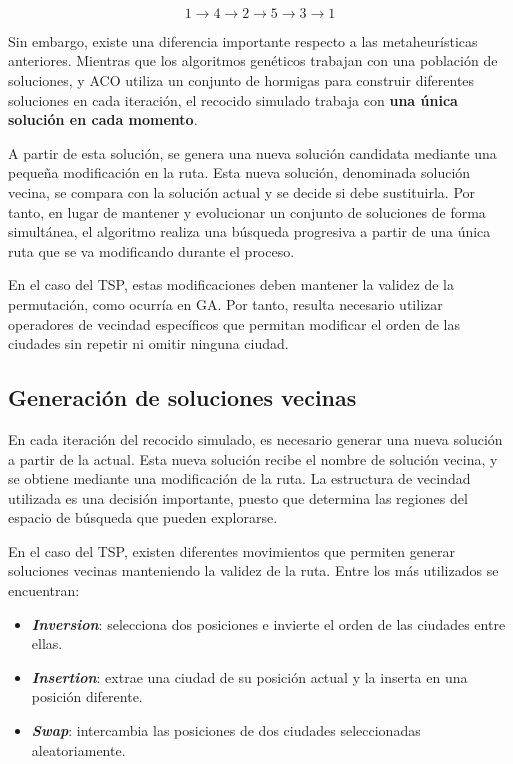 \begin{equation}
  1 \xrightarrow{} 4 \xrightarrow{} 2 \xrightarrow{} 5 \xrightarrow{} 3 \xrightarrow{} 1
\end{equation}

Sin embargo, existe una diferencia importante respecto a las metaheurísticas anteriores. Mientras que los algoritmos 
genéticos trabajan con una población de soluciones, y ACO utiliza un conjunto de hormigas para construir diferentes
soluciones en cada iteración, el recocido simulado trabaja con \textbf{una única solución en cada momento}.

A partir de esta solución, se genera una nueva solución candidata mediante una pequeña modificación en la ruta. Esta
nueva solución, denominada solución vecina, se compara con la solución actual y se decide si debe sustituirla. Por tanto,
en lugar de mantener y evolucionar un conjunto de soluciones de forma simultánea, el algoritmo realiza una búsqueda
progresiva a partir de una única ruta que se va modificando durante el proceso.

En el caso del TSP, estas modificaciones deben mantener la validez de la permutación, como ocurría en GA. Por tanto,
resulta necesario utilizar operadores de vecindad específicos que permitan modificar el orden de las ciudades sin 
repetir ni omitir ninguna ciudad. 

\subsection{Generación de soluciones vecinas}
\label{subsec:sa_neighbour_sol_gen}

En cada iteración del recocido simulado, es necesario generar una nueva solución a partir de la actual. Esta nueva 
solución recibe el nombre de solución vecina, y se obtiene mediante una modificación de la ruta. La estructura de 
vecindad utilizada es una decisión importante, puesto que determina las regiones del espacio de búsqueda que pueden
 explorarse.

En el caso del TSP, existen diferentes movimientos que permiten generar soluciones vecinas manteniendo la validez de la
ruta. Entre los más utilizados se encuentran:

\begin{itemize}
  \item \textbf{\textit{Inversion}}: selecciona dos posiciones e invierte el orden de las ciudades entre ellas.
  \item \textbf{\textit{Insertion}}: extrae una ciudad de su posición actual y la inserta en una posición diferente.
  \item \textbf{\textit{Swap}}: intercambia las posiciones de dos ciudades seleccionadas aleatoriamente.
\end{itemize}

